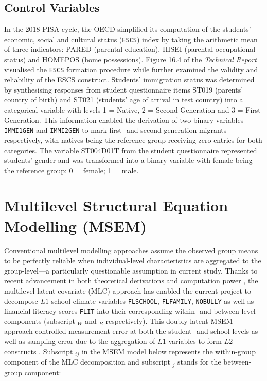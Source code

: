 \documentclass[a4paper,11pt,UKenglish,twoside,openright]{report}\usepackage[]{graphicx}\usepackage[]{color}
\begin{document}
\subsection{Control Variables}

In the 2018 PISA cycle, the OECD simplified its computation of the students' economic, social and cultural status (\texttt{ESCS}) index by taking the arithmetic mean of three indicators: \textsf{PARED} (parental education), \textsf{HISEI} (parental occupational status) and \textsf{HOMEPOS} (home possessions). Figure 16.4 of the \textit{Technical Report} \parencite{PISAtech} visualised the \texttt{ESCS} formation procedure while \textcite{avvisati:2020} further examined the validity and reliability of the ESCS construct. Students' immigration status was determined by synthesising responses from student questionnaire items \textsf{ST019} (parents' country of birth) and \textsf{ST021} (students' age of arrival in test country) \parencite[][pp. 212--213]{PISAvol3} into a categorical variable with levels \textsf{1 = Native}, \textsf{2 = Second-Generation} and \textsf{3 = First-Generation}. This information enabled the derivation of two binary variables \texttt{IMMI1GEN} and \texttt{IMMI2GEN} to mark first- and second-generation migrants respectively, with natives being the reference group receiving zero entries for both categories. The variable \textsf{ST004D01T} from the student questionnaire \parencite{FLdata} represented students' gender and was transformed into a binary variable with female being the reference group: \textsf{0 = female}; \textsf{1 = male}.

\section{Multilevel Structural Equation Modelling (MSEM)}

Conventional multilevel modelling approaches assume the observed group means to be perfectly reliable when individual-level characteristics are aggregated to the group-level---a particularly questionable assumption in current study. Thanks to recent advancement in both theoretical derivations \parencite{ludtke:2008, marsh:2009} and computation power \parencite{mplus}, the multilevel latent covariate (MLC) approach has enabled the current project to decompose $L1$ school climate variables \texttt{FLSCHOOL}, \texttt{FLFAMILY}, \texttt{NOBULLY} as well as financial literacy scores \texttt{FLIT} into their corresponding within- and between-level components (subscript $_W$ and $_B$ respectively). This doubly latent MSEM approach controlled measurement error at both the student- and school-levels as well as sampling error due to the aggregation of $L1$ variables to form $L2$ constructs \parencite{ludtke:2009, ludtke:2011, marsh:2012}. Subscript $_{ij}$ in the MSEM model below represents the within-group component of the MLC decomposition and subscript $_j$ stands for the between-group component:
\end{document}
